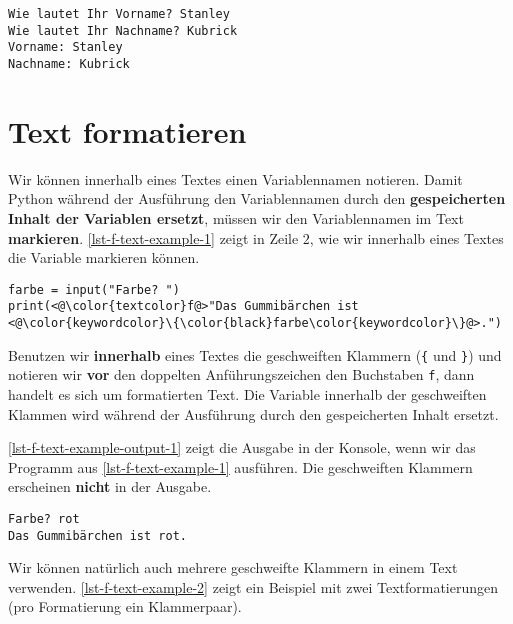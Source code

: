 \begin{lstlisting}[caption={Beispielausführung für das Programm aus \autoref{lst-input-example-2}.}, label=lst-input-example-output-2, language=output]
Wie lautet Ihr Vorname? Stanley
Wie lautet Ihr Nachname? Kubrick
Vorname: Stanley
Nachname: Kubrick
\end{lstlisting}

\section{Text formatieren}

Wir können innerhalb eines Textes einen Variablennamen notieren. Damit Python während der Ausführung den Variablennamen durch den \textbf{gespeicherten Inhalt der Variablen ersetzt}, müssen wir den Variablennamen im Text \textbf{markieren}. \autoref{lst-f-text-example-1} zeigt in Zeile $2$, wie wir innerhalb eines Textes die Variable markieren können.

\begin{lstlisting}[caption={Formatierter Text.}, label={lst-f-text-example-1}]
farbe = input("Farbe? ")
print(<@\color{textcolor}f@>"Das Gummibärchen ist <@\color{keywordcolor}\{\color{black}farbe\color{keywordcolor}\}@>.")
\end{lstlisting}

\begin{definition}
	Benutzen wir \textbf{innerhalb} eines Textes die geschweiften Klammern (\lstinline|{| und \lstinline|}|) und notieren wir \textbf{vor} den doppelten Anführungszeichen den Buchstaben \lstinline{f}, dann handelt es sich um formatierten Text. Die Variable innerhalb der geschweiften Klammen wird während der Ausführung durch den gespeicherten Inhalt ersetzt.
\end{definition}

\begin{example}
	\autoref{lst-f-text-example-output-1} zeigt die Ausgabe in der Konsole, wenn wir das Programm aus \autoref{lst-f-text-example-1} ausführen. Die geschweiften Klammern erscheinen \textbf{nicht} in der Ausgabe.
\end{example}

\begin{lstlisting}[caption={Der Variablennamen wird durch den gespeicherten Inhalt ersetzt.}, label=lst-f-text-example-output-1, language=output]
Farbe? rot
Das Gummibärchen ist rot.
\end{lstlisting}

Wir können natürlich auch mehrere geschweifte Klammern in einem Text verwenden. \autoref{lst-f-text-example-2} zeigt ein Beispiel mit zwei Textformatierungen (pro Formatierung ein Klammerpaar). 

